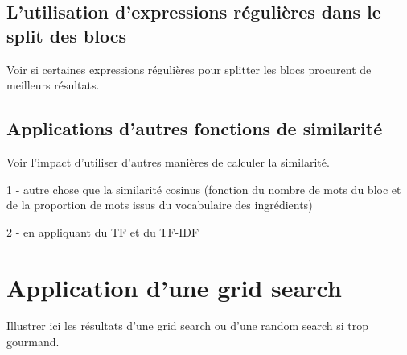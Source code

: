             \subsection{L'utilisation d'expressions régulières dans le split des blocs}

            Voir si certaines expressions régulières pour splitter les blocs procurent de meilleurs résultats.

            \subsection{Applications d'autres fonctions de similarité}

            Voir l'impact d'utiliser d'autres manières de calculer la similarité.

            1 - autre chose que la similarité cosinus (fonction du nombre de mots du bloc et de la proportion de mots issus du vocabulaire des ingrédients)

            2 - en appliquant du TF et du TF-IDF

        \section{Application d'une grid search}

        Illustrer ici les résultats d'une grid search ou d'une random search si trop gourmand.